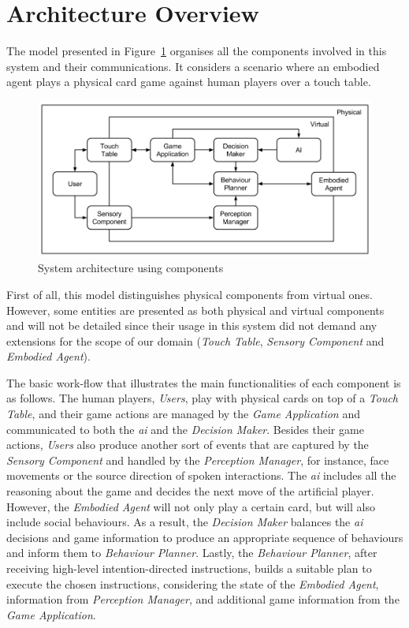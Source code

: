 \section{Architecture Overview}
\label{section:architecture_overview}

The model presented in Figure~\ref{fig:model} organises all the components involved in this system and their communications.
It considers a scenario where an embodied agent plays a physical card game against human players over a touch table.

\begin{figure}[ht]
  \centering
    \includegraphics[width=1\textwidth]{./img/architecture}
  \caption{System architecture using components}
\label{fig:model}
\end{figure}

First of all, this model distinguishes physical components from virtual ones.
However, some entities are presented as both physical and virtual components and will not be detailed since their usage in this system did not demand any extensions for the scope of our domain (\emph{Touch Table}, \emph{Sensory Component} and \emph{Embodied Agent}).

The basic work-flow that illustrates the main functionalities of each component is as follows.
The human players, \emph{Users}, play with physical cards on top of a \emph{Touch Table}, and their game actions are managed by the \emph{Game Application} and communicated to both the \emph{\ac{ai}} and the \emph{Decision Maker}.
Besides their game actions, \emph{Users} also produce another sort of events that are captured by the \emph{Sensory Component} and handled by the \emph{Perception Manager}, for instance, face movements or the source direction of spoken interactions.
The \emph{\ac{ai}} includes all the reasoning about the game and decides the next move of the artificial player.
However, the \emph{Embodied Agent} will not only play a certain card, but will also include social behaviours.
As a result, the \emph{Decision Maker} balances the \emph{\ac{ai}} decisions and game information to produce an appropriate sequence of behaviours and inform them to \emph{Behaviour Planner}.
Lastly, the \emph{Behaviour Planner}, after receiving high-level intention-directed instructions, builds a suitable plan to execute the chosen instructions, considering the state of the \emph{Embodied Agent}, information from \emph{Perception Manager}, and additional game information from the \emph{Game Application}.

